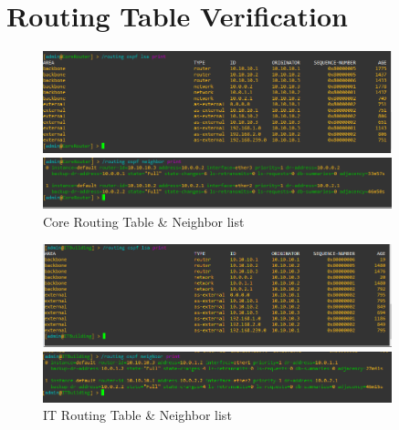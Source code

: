 \documentclass{article}
\begin{document}
	\section{Routing Table Verification}
		\begin{figure}[h!]
			\begin{minipage}{0.5\textwidth}
				\centering
				\includegraphics[width=0.9\textwidth]{core_routing_table}
			\end{minipage}%
			\begin{minipage}{0.5\textwidth}
				\centering
				\includegraphics[width=0.9\textwidth]{core_neighbors}
			\end{minipage}
			\caption{Core Routing Table \& Neighbor list}
		\end{figure}
		\begin{figure}[h!]
			\begin{minipage}{0.5\textwidth}
				\centering
				\includegraphics[width=0.9\textwidth]{it_routing_table}
			\end{minipage}%
			\begin{minipage}{0.5\textwidth}
				\centering
				\includegraphics[width=0.9\textwidth]{it_neighbors}
			\end{minipage}
			\caption{IT Routing Table \& Neighbor list}
		\end{figure}
\end{document}
